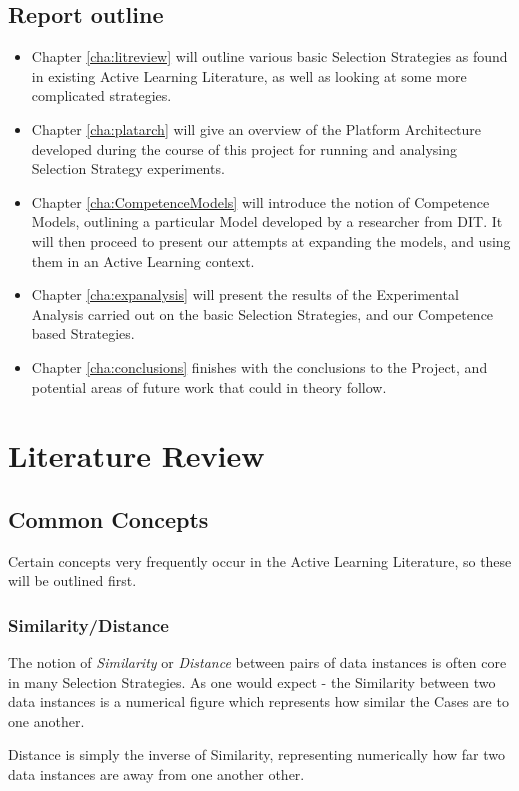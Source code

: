 \documentclass[a4paper,11pt]{report}
\begin{document}
\section{Report outline}
\begin{itemize}
	\item Chapter \ref{cha:litreview} will outline various basic Selection Strategies as found in existing Active Learning Literature, as well as looking at some more complicated strategies.
	\item Chapter \ref{cha:platarch} will give an overview of the Platform Architecture developed during the course of this project for running and analysing Selection Strategy experiments.
	\item Chapter \ref{cha:CompetenceModels} will introduce the notion of Competence Models, outlining a particular Model developed by a researcher from DIT. It will then proceed to present our attempts at expanding the models, and using them in an Active Learning context.
	\item Chapter \ref{cha:expanalysis} will present the results of the Experimental Analysis carried out on the basic Selection Strategies, and our Competence based Strategies.
	\item Chapter \ref{cha:conclusions} finishes with the conclusions to the Project, and potential areas of future work that could in theory follow.
\end{itemize}

\chapter{Literature Review\label{cha:litreview}}

\section{Common Concepts}
Certain concepts very frequently occur in the Active Learning Literature, so these will be outlined first.

\subsection{Similarity/Distance}
The notion of \emph{Similarity} or \emph{Distance} between pairs of data instances is often core in many Selection Strategies. As one would expect - the Similarity between two data instances is a numerical figure which represents how similar the Cases are to one another.

Distance is simply the inverse of Similarity, representing numerically how far two data instances are away from one another other.
\end{document}
